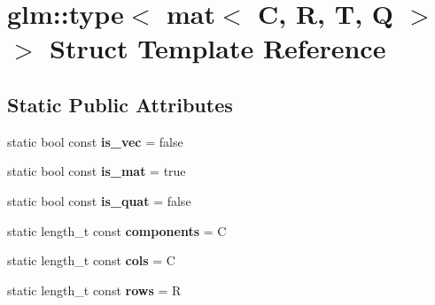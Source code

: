 \hypertarget{structglm_1_1type_3_01mat_3_01C_00_01R_00_01T_00_01Q_01_4_01_4}{}\section{glm\+:\+:type$<$ mat$<$ C, R, T, Q $>$ $>$ Struct Template Reference}
\label{structglm_1_1type_3_01mat_3_01C_00_01R_00_01T_00_01Q_01_4_01_4}
\subsection*{Static Public Attributes}
\begin{DoxyCompactItemize}
\item 
\mbox{\label{structglm_1_1type_3_01mat_3_01C_00_01R_00_01T_00_01Q_01_4_01_4_a6f4a616eae7863364fa05ed42d0d90c9}} 
static bool const {\bfseries is\+\_\+vec} = false
\item 
\mbox{\label{structglm_1_1type_3_01mat_3_01C_00_01R_00_01T_00_01Q_01_4_01_4_a8fb529c47b93fcd9c446bb960d6e1fc9}} 
static bool const {\bfseries is\+\_\+mat} = true
\item 
\mbox{\label{structglm_1_1type_3_01mat_3_01C_00_01R_00_01T_00_01Q_01_4_01_4_ab9f23373d46f9d066cd6274c79d0527f}} 
static bool const {\bfseries is\+\_\+quat} = false
\item 
\mbox{\label{structglm_1_1type_3_01mat_3_01C_00_01R_00_01T_00_01Q_01_4_01_4_a4f440364136d8fa3a62b2e1bfff81a01}} 
static length\+\_\+t const {\bfseries components} = C
\item 
\mbox{\label{structglm_1_1type_3_01mat_3_01C_00_01R_00_01T_00_01Q_01_4_01_4_a9be28abe8d17849b7a6cd499e8982996}} 
static length\+\_\+t const {\bfseries cols} = C
\item 
\mbox{\label{structglm_1_1type_3_01mat_3_01C_00_01R_00_01T_00_01Q_01_4_01_4_a638d8b45554f37be410a7275a744f875}} 
static length\+\_\+t const {\bfseries rows} = R
\end{DoxyCompactItemize}


